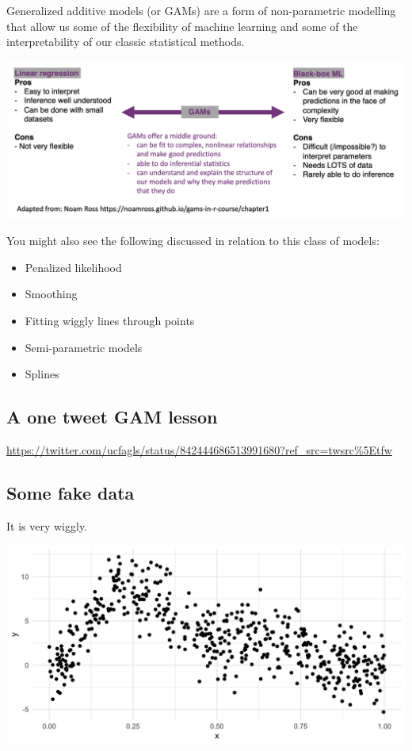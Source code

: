 \documentclass[
  openany]{book}
\providecommand{\tightlist}{%
  \setlength{\itemsep}{0pt}\setlength{\parskip}{0pt}}
\begin{document}
Generalized additive models (or GAMs) are a form of non-parametric modelling that allow us some of the flexibility of machine learning and some of the interpretability of our classic statistical methods.

\begin{center}\includegraphics[width=0.95\linewidth]{images/m5/continuum} \end{center}

You might also see the following discussed in relation to this class of models:

\begin{itemize}
\tightlist
\item
  Penalized likelihood\\
\item
  Smoothing\\
\item
  Fitting wiggly lines through points\\
\item
  Semi-parametric models\\
\item
  Splines
\end{itemize}

\hypertarget{a-one-tweet-gam-lesson}{%
\subsection{A one tweet GAM lesson}\label{a-one-tweet-gam-lesson}}

\url{https://twitter.com/ucfagls/status/842444686513991680?ref_src=twsrc\%5Etfw}

\hypertarget{some-fake-data}{%
\subsection{Some fake data}\label{some-fake-data}}

It is very wiggly.

\begin{center}\includegraphics[width=0.95\linewidth]{images/m5/fake} \end{center}
\end{document}
